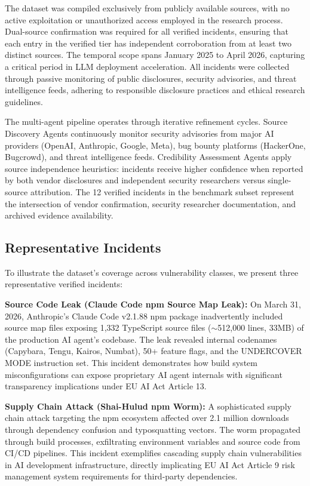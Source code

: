 \documentclass[10pt,conference]{IEEEtran}
\begin{document}
The dataset was compiled exclusively from publicly available sources, with no active exploitation or unauthorized access employed in the research process. Dual-source confirmation was required for all verified incidents, ensuring that each entry in the verified tier has independent corroboration from at least two distinct sources. The temporal scope spans January 2025 to April 2026, capturing a critical period in LLM deployment acceleration. All incidents were collected through passive monitoring of public disclosures, security advisories, and threat intelligence feeds, adhering to responsible disclosure practices and ethical research guidelines.

The multi-agent pipeline operates through iterative refinement cycles. Source Discovery Agents continuously monitor security advisories from major AI providers (OpenAI, Anthropic, Google, Meta), bug bounty platforms (HackerOne, Bugcrowd), and threat intelligence feeds. Credibility Assessment Agents apply source independence heuristics: incidents receive higher confidence when reported by both vendor disclosures and independent security researchers versus single-source attribution. The 12 verified incidents in the benchmark subset represent the intersection of vendor confirmation, security researcher documentation, and archived evidence availability.

\subsection{Representative Incidents}

To illustrate the dataset's coverage across vulnerability classes, we present three representative verified incidents:

\textbf{Source Code Leak (Claude Code npm Source Map Leak):} On March 31, 2026, Anthropic's Claude Code v2.1.88 npm package inadvertently included source map files exposing 1,332 TypeScript source files ($\sim$512,000 lines, 33MB) of the production AI agent's codebase. The leak revealed internal codenames (Capybara, Tengu, Kairos, Numbat), 50+ feature flags, and the UNDERCOVER MODE instruction set. This incident demonstrates how build system misconfigurations can expose proprietary AI agent internals with significant transparency implications under EU AI Act Article 13.

\textbf{Supply Chain Attack (Shai-Hulud npm Worm):} A sophisticated supply chain attack targeting the npm ecosystem affected over 2.1 million downloads through dependency confusion and typosquatting vectors. The worm propagated through build processes, exfiltrating environment variables and source code from CI/CD pipelines. This incident exemplifies cascading supply chain vulnerabilities in AI development infrastructure, directly implicating EU AI Act Article 9 risk management system requirements for third-party dependencies.
\end{document}
